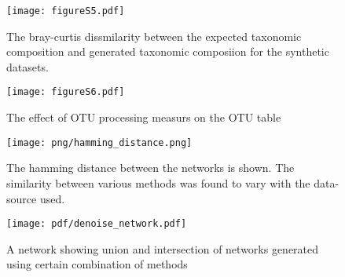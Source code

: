   \begin{figure}[h]
    \centering
    \texttt{[image: figureS5.pdf]}
    \caption{
      The bray-curtis dissmilarity between the expected taxonomic composition and generated taxonomic composiion for the synthetic datasets.
  }
    \label{fig:figureS4}
  \end{figure}

  \begin{figure}[h]
    \centering
    \texttt{[image: figureS6.pdf]}
    \caption{
      The effect of OTU processing measurs on the OTU table
  }
    \label{fig:figureS4}
  \end{figure}

  \begin{figure}[h]
    \centering
    \texttt{[image: png/hamming\_distance.png]}
    \caption{The hamming distance between the networks is shown. The similarity between various methods was found to vary with the data-source used.}
    \label{fig:figureS4}
  \end{figure}

  \begin{figure}[h]
    \centering
    \texttt{[image: pdf/denoise\_network.pdf]}
    \caption{A network showing union and intersection of networks generated using certain combination of methods}
    \label{fig:figureS5}
  \end{figure}
